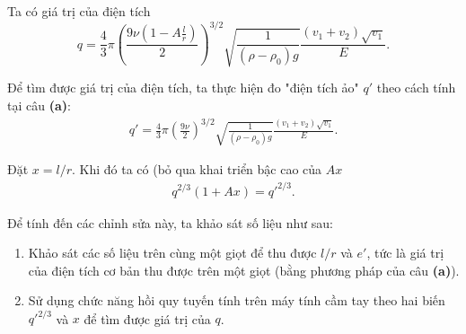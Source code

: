 Ta có giá trị của điện tích
\begin{equation}
\label{qthuc}
q = \frac{4}{3} \pi \left(\dfrac{9\nu \left(1 - A \frac{l}{r}\right)}{2}\right)^{3/2} \sqrt{\frac{1}{(\rho-\rho_0)g}} \frac {(v_1 + v_2)\sqrt{v_1}}{E}.
\end{equation}

Để tìm được giá trị của điện tích, ta thực hiện đo "điện tích ảo" $q'$ theo cách tính tại câu \textbf{(a)}:
\begin{align}
q' = \frac{4}{3} \pi \left(\frac{9\nu}{2}\right)^{3/2} \sqrt{\frac{1}{(\rho-\rho_0)g}} \frac {(v_1 + v_2)\sqrt{v_1}}{E}.
\end{align}

Đặt $x = l/r$. Khi đó ta có (bỏ qua khai triển bậc cao của $Ax$
\begin{align}
q^{2/3} (1 + Ax) = q'^{2/3}.
\end{align}

Để tính đến các chỉnh sửa này, ta khảo sát số liệu như sau: 

\begin{enumerate}[label=\textbf{\arabic*,}]\itemsep0em
\item Khảo sát các số liệu trên cùng một giọt để thu được $l/r$ và $e'$, tức là giá trị của điện tích cơ bản thu được trên một giọt (bằng phương pháp của câu \textbf{(a)}).
\item Sử dụng chức năng hồi quy tuyến tính trên máy tính cầm tay theo hai biến $q'^{2/3}$ và $x$ để tìm được giá trị của $q$. 
\end{enumerate}

